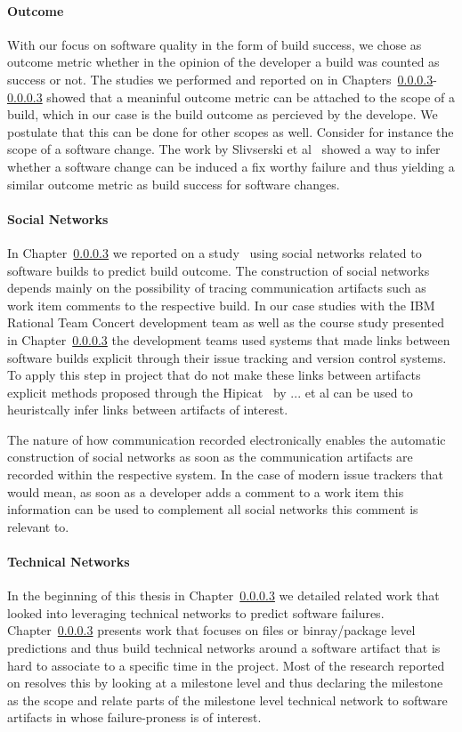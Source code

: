 \paragraph{Outcome}
With our focus on software quality in the form of build success, we chose as outcome metric whether in the opinion of the developer a build was counted as success or not.
The studies we performed and reported on in Chapters~\ref{}-\ref{} showed that a meaninful outcome metric can be attached to the scope of a build, which in our case is the build outcome as percieved by the develope.
We postulate that this can be done for other scopes as well.
Consider for instance the scope of a software change.
The work by Slivserski et al~\cite{} showed a way to infer whether a software change can be induced a fix worthy failure and thus yielding a similar outcome metric as build success for software changes. 

\paragraph{Social Networks}
In Chapter~\ref{} we reported on a study~\cite{wolf:icse:2009} using social networks related to software builds to predict build outcome.
The construction of social networks depends mainly on the possibility of tracing communication artifacts such as work item comments to the respective build.
In our case studies with the IBM Rational Team Concert development team as well as the course study presented in Chapter~\ref{} the development teams used systems that made links between software builds explicit through their issue tracking and version control systems.
To apply this step in project that do not make these links between artifacts explicit methods proposed through the Hipicat~\cite{} by ... et al can be used to heuristcally infer links between artifacts of interest.

The nature of how communication recorded electronically enables the automatic construction of social networks as soon as the communication artifacts are recorded within the respective system.
In the case of modern issue trackers that would mean, as soon as a developer adds a comment to a work item this information can be used to complement all social networks this comment is relevant to.

\paragraph{Technical Networks}
In the beginning of this thesis in Chapter~\ref{} we detailed related work that looked into leveraging technical networks to predict software failures.
Chapter~\ref{} presents work that focuses on files or binray/package level predictions and thus build technical networks around a software artifact that is hard to associate to a specific time in the project.
Most of the research reported on resolves this by looking at a milestone level and thus declaring the milestone as the scope and relate parts of the milestone level technical network to software artifacts in whose failure-proness is of interest.

